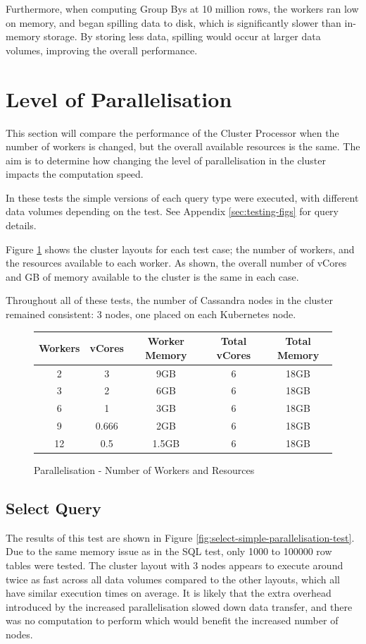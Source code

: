 Furthermore, when computing Group Bys at 10 million rows, the workers ran low on memory, and began spilling data to disk, which is significantly slower than in-memory storage. By storing less data, spilling would occur at larger data volumes, improving the overall performance.



\section{Level of Parallelisation}\label{sec:parallelisation-test}
This section will compare the performance of the Cluster Processor when the number of workers is changed, but the overall available resources is the same. The aim is to determine how changing the level of parallelisation in the cluster impacts the computation speed. 

In these tests the simple versions of each query type were executed, with different data volumes depending on the test. See Appendix \ref{sec:testing-figs} for query details. 

Figure \ref{fig:parallelisation-test-workers} shows the cluster layouts for each test case; the number of workers, and the resources available to each worker. As shown, the overall number of vCores and GB of memory available to the cluster is the same in each case. 

Throughout all of these tests, the number of Cassandra nodes in the cluster remained consistent: 3 nodes, one placed on each Kubernetes node.

\begin{figure}[ht]
	\centering
	\begin{tabular}{| c | c | c | c | c |}
		\hline
		\textbf{Workers} & \textbf{vCores} & \textbf{Worker Memory} & \textbf{Total vCores} & \textbf{Total Memory} \\ \hline
		2 & 3 & 9GB & 6 & 18GB \\ \hline
		3 & 2 & 6GB & 6 & 18GB \\ \hline
		6 & 1 & 3GB & 6 & 18GB \\ \hline
		9 & 0.666 & 2GB & 6 & 18GB \\ \hline
		12 & 0.5 & 1.5GB & 6 & 18GB \\ \hline
	\end{tabular}
	\caption{Parallelisation - Number of Workers and Resources}
	\label{fig:parallelisation-test-workers}
\end{figure}

\subsection{Select Query}
The results of this test are shown in Figure \ref{fig:select-simple-parallelisation-test}. Due to the same memory issue as in the SQL test, only 1000 to 100000 row tables were tested. The cluster layout with 3 nodes appears to execute around twice as fast across all data volumes compared to the other layouts, which all have similar execution times on average. It is likely that the extra overhead introduced by the increased parallelisation slowed down data transfer, and there was no computation to perform which would benefit the increased number of nodes. 


